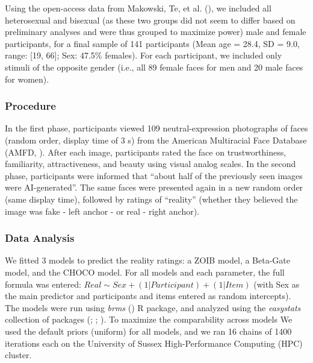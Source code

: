 \documentclass[
  jou,
  floatsintext,
  longtable,
  nolmodern,
  notxfonts,
  notimes,
  colorlinks=true,linkcolor=blue,citecolor=blue,urlcolor=blue]{apa7}
\begin{document}
Using the open-access data from Makowski, Te, et al.
(), we included all heterosexual and
bisexual (as these two groups did not seem to differ based on
preliminary analyses and were thus grouped to maximize power) male and
female participants, for a final sample of 141 participants (Mean age =
28.4, SD = 9.0, range: {[}19, 66{]}; Sex: 47.5\% females). For each
participant, we included only stimuli of the opposite gender (i.e., all
89 female faces for men and 20 male faces for women).

\subsubsection{Procedure}\label{procedure}

In the first phase, participants viewed 109 neutral-expression
photographs of faces (random order, display time of 3 s) from the
American Multiracial Face Database (AMFD,
). After each image,
participants rated the face on trustworthiness, familiarity,
attractiveness, and beauty using visual analog scales. In the second
phase, participants were informed that ``about half of the previously
seen images were AI-generated''. The same faces were presented again in
a new random order (same display time), followed by ratings of
``reality'' (whether they believed the image was fake - left anchor - or
real - right anchor).

\subsubsection{Data Analysis}\label{data-analysis}

We fitted 3 models to predict the reality ratings: a ZOIB model, a
Beta-Gate model, and the CHOCO model. For all models and each parameter,
the full formula was entered:
\(Real\sim Sex + (1 | Participant) + (1 | Item)\) (with Sex as the main
predictor and participants and items entered as random intercepts). The
models were run using \emph{brms}
() R package, and analyzed
using the \emph{easystats} collection of packages
(;
; ). To
maximize the comparability across models We used the default priors
(uniform) for all models, and we ran 16 chains of 1400 iterations each
on the University of Sussex High-Performance Computing (HPC) cluster.
\end{document}

